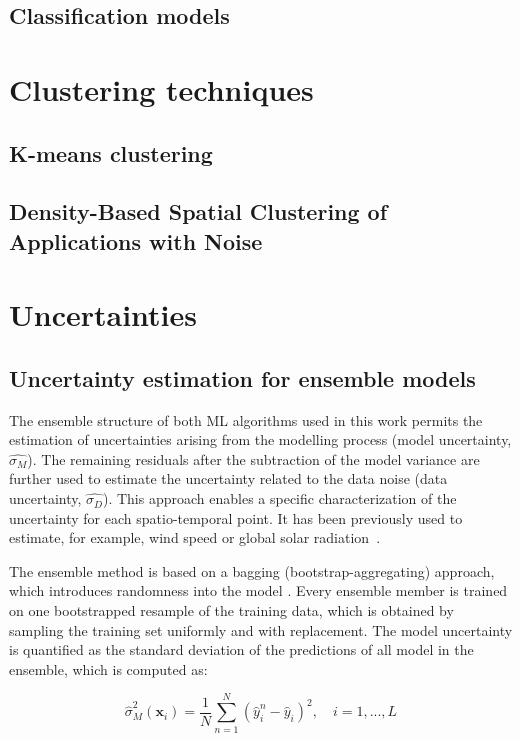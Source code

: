 \subsection{Classification models}

 
\section{Clustering techniques}
\subsection{K-means clustering}
\subsection{Density-Based Spatial Clustering of Applications with Noise}


\section{Uncertainties}
\subsection{Uncertainty estimation for ensemble models}
\label{unc_ML}

The ensemble structure of both ML algorithms used in this work permits the estimation of uncertainties arising from the modelling process (model uncertainty, $\hat{\sigma_M}$). The remaining residuals after the subtraction of the model variance are further used to estimate the uncertainty related to the data noise (data uncertainty, $\hat{\sigma_D}$). 
This approach enables a specific characterization of the uncertainty for each spatio-temporal point.
It has been previously used to estimate, for example, wind speed or global solar radiation~\cite{walch_spatio-temporal_2019, wan_probabilistic_2014}.

The ensemble method is based on a bagging (bootstrap-aggregating) approach, which introduces randomness into the model  \cite{breiman_bagging_1996}.
Every ensemble member is trained on one bootstrapped resample of the training data, which is
obtained by sampling the training set uniformly and with replacement.
The model uncertainty is quantified as the standard deviation of the predictions of all model in the ensemble, which is computed as:

\begin{equation}
\label{eq:model_unc}
  \hat{\sigma}_M^2 (\mathbf{x}_i) = \frac{1}{N} \sum_{n=1}^N (\hat{y}_i^n - \hat{y}_i)^2, \quad i=1,...,L
\end{equation}


